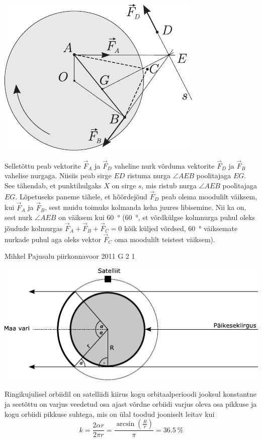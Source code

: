 \documentclass[11pt]{article}
\begin{document}
{{\begin{center}
	\includegraphics[width=0.7\linewidth]{2005-v3g-10-lah}
\end{center}

Selletõttu peab vektorite $\vec F_A$ ja $\vec F_D$ vaheline nurk võrduma vektorite $\vec F_D$ ja $\vec F_B$ vahelise nurgaga. Niisiis peab sirge $ED$ ristuma nurga $\angle AEB$ poolitajaga $EG$. See tähendab, et punktihulgaks $X$ on sirge $s$, mis ristub nurga $\angle AEB$ poolitajaga $EG$. Lõpetuseks paneme tähele, et hõõrdejõud $\vec F_D$ peab olema moodulilt väiksem, kui $\vec F_A$ ja $\vec F_B$, sest muidu toimuks kolmanda keha juures libisemine. Nii ka on, sest nurk $\angle AEB$ on väiksem kui \SI{60}{\degree} (\SI{60}{\degree}, st võrdkülgse kolmnurga puhul oleks jõudude kolmurgas $\vec F_A + \vec F_B + \vec F_C = 0$ kõik küljed võrdsed, \SI{60}{\degree} väiksemate nurkade puhul aga oleks vektor $\vec F_C$ oma moodulilt teistest väiksem).
\fi
}

{Mihkel Pajusalu} %
{piirkonnavoor} %
{2011} %
{G 2} %
{1} %
{

\ifSolution
\begin{center}
	\includegraphics[width=0.9\linewidth]{2011-v2g-02-lah}
\end{center}
Ringikujulisel orbiidil on satelliidi kiirus kogu orbitaalperioodi jooksul konstantne ja seetõttu on varjus veedetud osa ajast võrdne orbiidi varjus oleva osa pikkuse ja kogu orbiidi pikkuse suhtega, mis on ülal toodud jooniselt leitav kui 
\[
k=\frac{2 \alpha r}{2 \pi r}=\frac{\arcsin \left(\frac{R}{r}\right)}{\pi}=\SI{36,5}{\%}
\]
\fi
}

}
\end{document}
